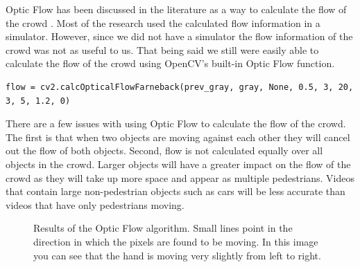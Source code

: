 \documentclass[12pt, onecolumn, conference]{IEEEtran}
\begin{document}
Optic Flow has been discussed in the literature as a way to calculate the flow of the crowd \cite{N. Courty}\cite{B. Boghossian}\cite{R. Mehran}. Most of the research used the calculated flow information in a simulator. However, since we did not have a simulator the flow information of the crowd was not as useful to us. That being said we still were easily able to calculate the flow of the crowd using OpenCV’s built-in Optic Flow function. \\

\begin{lstlisting}
flow = cv2.calcOpticalFlowFarneback(prev_gray, gray, None, 0.5, 3, 20, 3, 5, 1.2, 0)
\end{lstlisting}

There are a few issues with using Optic Flow to calculate the flow of the crowd. The first is that when two objects are moving against each other they will cancel out the flow of both objects. Second, flow is not calculated equally over all objects in the crowd. Larger objects will have a greater impact on the flow of the crowd as they will take up more space and appear as multiple pedestrians. Videos that contain large non-pedestrian objects such as cars will be less accurate than videos that have only pedestrians moving.

\begin{figure}[!t]
\centering
{}
\hfil
{}
\caption{Results of the Optic Flow algorithm. Small lines point in the direction in which the pixels are found to be moving. In this image you can see that the hand is moving very slightly from left to right.}
\label{Optic_Flow}
\end{figure}
\end{document}
